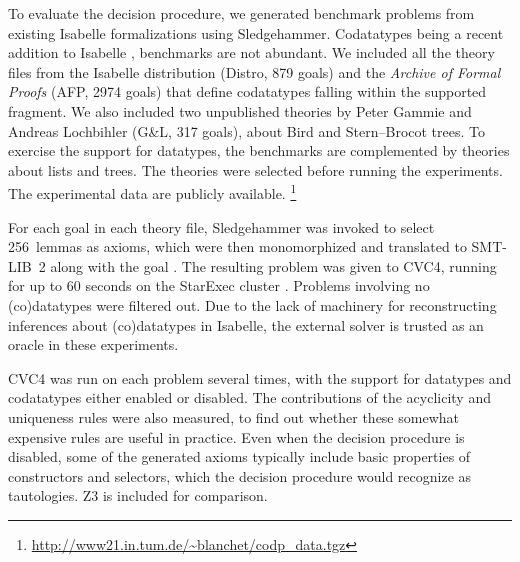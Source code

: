 \newcommand\gandl{G\&L}
\newcommand\HD[1]{\hbox to2.25em{\footnotesize\hfill\!\!\!\!#1\!\!\!\!\hfill}}

To evaluate the decision procedure, we generated benchmark problems from existing
Isabelle formalizations using Sledgehammer.
Codatatypes being a recent addition to Isabelle
\cite{blanchette-et-al-2014-impl}, benchmarks are not abundant. We
included all the theory files from the Isabelle distribution (Distro, 879 goals)
and the \emph{Archive of Formal Proofs} (AFP, 2974 goals) \cite{klein-et-al-afp}
that define codatatypes falling within the supported fragment. We also included
two unpublished theories by Peter Gammie and Andreas Lochbihler (\gandl, 317
goals), about Bird and Stern--Brocot trees. To exercise the support
for datatypes, the benchmarks are complemented by theories about lists
and trees. The theories were selected before running the
experiments. The experimental data are publicly available.%
\footnote{\url{http://www21.in.tum.de/~blanchet/codp_data.tgz}}


For each goal in each theory file, Sledgehammer was invoked to select
256~lemmas as axioms, which were then monomorphized and translated to SMT-LIB~2
along with the goal \cite{blanchette-et-al-2013-smt}. The resulting problem was
given to CVC4, running for up to 60 seconds on the StarExec cluster
\cite{stump-et-al-2014-starexec}. Problems involving no (co)datatypes were
filtered out. Due to the lack of machinery for reconstructing inferences about
(co)datatypes in Isabelle, the external solver is trusted as an oracle in these
experiments.

CVC4 was run on each problem several times, with the support for datatypes and
codatatypes either enabled or disabled. The contributions of the acyclicity and
uniqueness rules were also measured, to find out whether these somewhat
expensive rules are useful in practice. Even when the decision procedure is
disabled, some of the generated axioms typically include basic properties of
constructors and selectors, which the decision procedure would recognize as
tautologies. Z3 is included for comparison. %


